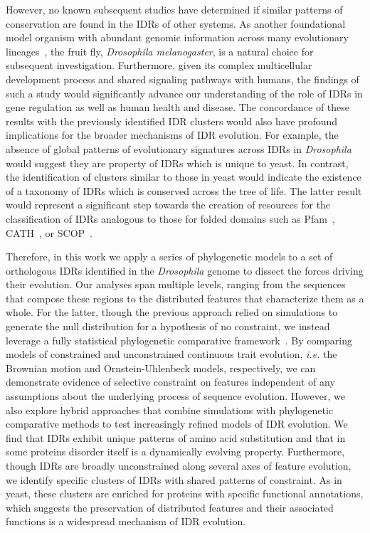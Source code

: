 However, no known subsequent studies have determined if similar patterns of conservation are found in the IDRs of other systems. As another foundational model organism with abundant genomic information across many evolutionary lineages~\cite{Yang2018, Miller2018, Kim2021, Gramates2022}, the fruit fly, \textit{Drosophila melanogaster}, is a natural choice for subsequent investigation. Furthermore, given its complex multicellular development process and shared signaling pathways with humans, the findings of such a study would significantly advance our understanding of the role of IDRs in gene regulation as well as human health and disease. The concordance of these results with the previously identified IDR clusters would also have profound implications for the broader mechanisms of IDR evolution. For example, the absence of global patterns of evolutionary signatures across IDRs in \textit{Drosophila} would suggest they are property of IDRs which is unique to yeast. In contrast, the identification of clusters similar to those in yeast would indicate the existence of a taxonomy of IDRs which is conserved across the tree of life. The latter result would represent a significant step towards the creation of resources for the classification of IDRs analogous to those for folded domains such as Pfam~\cite{Mistry2020}, CATH~\cite{Sillitoe2020}, or SCOP~\cite{Andreeva2013, Andreeva2019}.

Therefore, in this work we apply a series of phylogenetic models to a set of orthologous IDRs identified in the \textit{Drosophila} genome to dissect the forces driving their evolution. Our analyses span multiple levels, ranging from the sequences that compose these regions to the distributed features that characterize them as a whole. For the latter, though the previous approach relied on simulations to generate the null distribution for a hypothesis of no constraint, we instead leverage a fully statistical phylogenetic comparative framework~\cite{Cornwell2017}. By comparing models of constrained and unconstrained continuous trait evolution, \textit{i.e.} the Brownian motion and Ornstein-Uhlenbeck models, respectively, we can demonstrate evidence of selective constraint on features independent of any assumptions about the underlying process of sequence evolution. However, we also explore hybrid approaches that combine simulations with phylogenetic comparative methods to test increasingly refined models of IDR evolution. We find that IDRs exhibit unique patterns of amino acid substitution and that in some proteins disorder itself is a dynamically evolving property. Furthermore, though IDRs are broadly unconstrained along several axes of feature evolution, we identify specific clusters of IDRs with shared patterns of constraint. As in yeast, these clusters are enriched for proteins with specific functional annotations, which suggests the preservation of distributed features and their associated functions is a widespread mechanism of IDR evolution.

